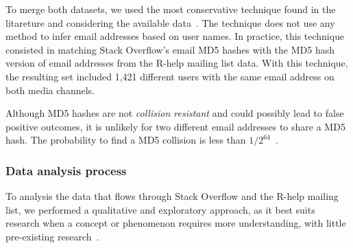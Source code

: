 \documentclass{sig-alternate-05-2015}
\begin{document}

To merge both datasets, we used the most conservative technique found in the litareture and considering the available data~\cite{Vasilescu2014b}.
The technique does not use any method to infer email addresses based on user names.
In practice, this technique consisted in matching Stack Overflow's email MD5 hashes with the MD5 hash version of email addresses from the R-help mailing list data.
With this technique, the resulting set included 1,421 different users with the same email address on both media channels.


	Although MD5 hashes are not \textit{collision resistant} and could possibly lead to false positive outcomes, it is unlikely for two different email addresses to share a MD5 hash.
    The probability to find a MD5 collision is less than $1/2^{64}$~\cite{Rivest1992}.

\subsubsection{Data analysis process}
\label{sec:dap}

To analysis the data that flows through Stack Overflow and the R-help mailing list, we performed a qualitative and exploratory approach, as it best suits research when a concept or phenomenon requires more understanding, with little pre-existing research~\cite{Creswell2009}.
\end{document}
